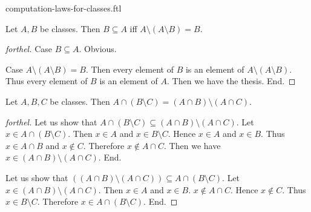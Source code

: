 \documentclass{naproche-library}
\begin{document}
\begin{smodule}{computation-laws-for-classes.ftl}
  \begin{proposition}[forthel,id=FOUNDATIONS_02_4938646769631232,printid]
    Let $A, B$ be classes.
    Then $B \subseteq A$ iff $A \setminus (A \setminus B) = B$.
  \end{proposition}
  \begin{proof}[forthel]
    Case $B \subseteq A$. Obvious.

    Case $A \setminus (A \setminus B) = B$.
      Then every element of $B$ is an element of $A \setminus (A \setminus B)$.
      Thus every element of $B$ is an element of $A$.
      Then we have the thesis.
    End.
  \end{proof}

  \begin{proposition}[forthel,id=FOUNDATIONS_02_5811954316738560,printid]
    Let $A, B, C$ be classes.
    Then $A \cap (B \setminus C) = (A \cap B) \setminus (A \cap C)$.
  \end{proposition}
  \begin{proof}[forthel]
    Let us show that $A \cap (B \setminus C) \subseteq (A \cap B) \setminus (A \cap C)$.
      Let $x \in A \cap (B \setminus C)$.
      Then $x \in A$ and $x \in B \setminus C$.
      Hence $x \in A$ and $x \in B$.
      Thus $x \in A \cap B$ and $x \notin C$.
      Therefore $x \notin A \cap C$.
      Then we have $x \in (A \cap B) \setminus (A \cap C)$.
    End.

    Let us show that $((A \cap B) \setminus (A \cap C)) \subseteq A \cap (B \setminus C)$. %
      Let $x \in (A \cap B) \setminus (A \cap C)$.
      Then $x \in A$ and $x \in B$.
      $x \notin A \cap C$.
      Hence $x \notin C$.
      Thus $x \in B \setminus C$.
      Therefore $x \in A \cap (B \setminus C)$.
    End.
  \end{proof}
\end{smodule}
\end{document}
